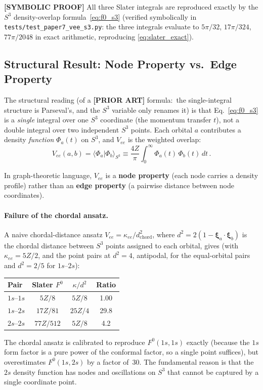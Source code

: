 \documentclass[aps,pra,twocolumn,superscriptaddress,longbibliography]{revtex4-2}
\begin{document}
\textbf{[SYMBOLIC PROOF]} All three Slater integrals are reproduced exactly by the $S^3$
density-overlap formula~\eqref{eq:f0_s3} (verified symbolically in
\texttt{tests/test\_paper7\_vee\_s3.py}: the three integrals evaluate to
$5\pi/32$, $17\pi/324$, $77\pi/2048$ in exact arithmetic, reproducing
\eqref{eq:slater_exact}).

\subsection{Structural Result: Node Property vs.\ Edge Property}
\label{sec:node_vs_edge}

The structural reading (of a \textbf{[PRIOR ART]} formula:\ the
single-integral structure is Parseval's, and the $S^3$ variable only
renames it) is that
Eq.~\eqref{eq:f0_s3} is a \emph{single} integral over one $S^3$
coordinate (the momentum transfer $t$), not a double integral over
two independent $S^3$ points. Each orbital $a$ contributes a density
\emph{function} $\Phi_a(t)$ on $S^3$, and $V_{ee}$ is the weighted
overlap:
\begin{equation}
  V_{ee}(a,b) = \langle \Phi_a | \Phi_b \rangle_{S^3}
  \equiv \frac{4Z}{\pi} \int_0^\infty \Phi_a(t) \, \Phi_b(t) \, dt \,.
\end{equation}

In graph-theoretic language, $V_{ee}$ is a \textbf{node property}
(each node carries a density profile) rather than an \textbf{edge
property} (a pairwise distance between node coordinates).

\paragraph{Failure of the chordal ansatz.}
A naive chordal-distance ansatz $V_{ee} = \kappa_{ee}/d^2_{\text{chord}}$,
where $d^2 = 2(1 - \boldsymbol{\xi}_a \cdot \boldsymbol{\xi}_b)$
is the chordal distance between $S^3$ points assigned to each orbital,
gives (with $\kappa_{ee} = 5Z/2$, and the point pairs at $d^2 = 4$, antipodal,
for the equal-orbital pairs and $d^2 = 2/5$ for $1s$--$2s$):
\begin{center}
\begin{tabular}{lccc}
\hline
Pair & Slater $F^0$ & $\kappa/d^2$ & Ratio \\
\hline
$1s$--$1s$ & $5Z/8$ & $5Z/8$ & 1.00 \\
$1s$--$2s$ & $17Z/81$ & $25Z/4$ & 29.8 \\
$2s$--$2s$ & $77Z/512$ & $5Z/8$ & 4.2 \\
\hline
\end{tabular}
\end{center}
The chordal ansatz is calibrated to reproduce $F^0(1s,1s)$ exactly
(because the $1s$ form factor is a pure power of the conformal factor,
so a single point suffices), but overestimates $F^0(1s,2s)$ by a factor of~30.
The fundamental reason is that the $2s$ density function has nodes
and oscillations on $S^3$ that cannot be captured by a single coordinate
point.
\end{document}
